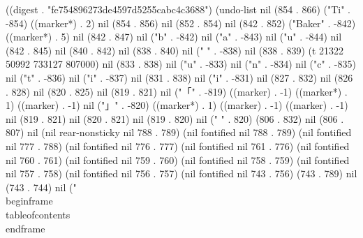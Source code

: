 
((digest . "fe754896273de4597d5255cabc4c3688") (undo-list nil (854 . 866) ("Ti" . -854) ((marker*) . 2) nil (854 . 856) nil (852 . 854) nil (842 . 852) ("Baker" . -842) ((marker*) . 5) nil (842 . 847) nil ("b" . -842) nil ("a" . -843) nil ("u" . -844) nil (842 . 845) nil (840 . 842) nil (838 . 840) nil (" " . -838) nil (838 . 839) (t 21322 50992 733127 807000) nil (833 . 838) nil ("u" . -833) nil ("n" . -834) nil ("c" . -835) nil ("t" . -836) nil ("i" . -837) nil (831 . 838) nil ("i" . -831) nil (827 . 832) nil (826 . 828) nil (820 . 825) nil (819 . 821) nil ("「" . -819) ((marker) . -1) ((marker*) . 1) ((marker) . -1) nil ("」" . -820) ((marker*) . 1) ((marker) . -1) ((marker) . -1) nil (819 . 821) nil (820 . 821) nil (819 . 820) nil (" " . 820) (806 . 832) nil (806 . 807) nil (nil rear-nonsticky nil 788 . 789) (nil fontified nil 788 . 789) (nil fontified nil 777 . 788) (nil fontified nil 776 . 777) (nil fontified nil 761 . 776) (nil fontified nil 760 . 761) (nil fontified nil 759 . 760) (nil fontified nil 758 . 759) (nil fontified nil 757 . 758) (nil fontified nil 756 . 757) (nil fontified nil 743 . 756) (743 . 789) nil (743 . 744) nil ("\\begin{frame}{}
 \\tableofcontents
\\end{frame}
